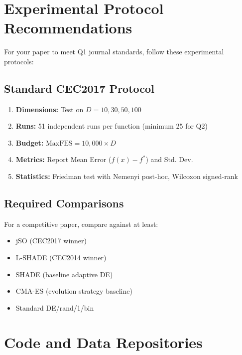 \documentclass[11pt]{article}
\begin{document}
\section{Experimental Protocol Recommendations}

For your paper to meet Q1 journal standards, follow these experimental protocols:

\subsection{Standard CEC2017 Protocol}
\begin{enumerate}
    \item \textbf{Dimensions:} Test on $D = 10, 30, 50, 100$
    \item \textbf{Runs:} 51 independent runs per function (minimum 25 for Q2)
    \item \textbf{Budget:} $\text{MaxFES} = 10{,}000 \times D$
    \item \textbf{Metrics:} Report Mean Error ($f(x) - f^*$) and Std. Dev.
    \item \textbf{Statistics:} Friedman test with Nemenyi post-hoc, Wilcoxon signed-rank
\end{enumerate}

\subsection{Required Comparisons}
For a competitive paper, compare against at least:
\begin{itemize}
    \item jSO (CEC2017 winner)
    \item L-SHADE (CEC2014 winner)
    \item SHADE (baseline adaptive DE)
    \item CMA-ES (evolution strategy baseline)
    \item Standard DE/rand/1/bin
\end{itemize}

\section{Code and Data Repositories}
\end{document}

